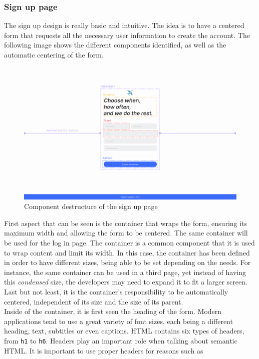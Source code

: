 \documentclass[./memory.tex]{subfiles}
\begin{document}
\subsubsection{Sign up page}
The sign up design is really basic and intuitive. The idea is to have a centered
form that requests all the necessary user information to create the account. The
following image shows the different components identified, as well as the
automatic centering of the form.
\begin{figure}[H]
	\centering
	\includegraphics[width=\textwidth]{./assets/designs/sign-up-components.png}
	\caption{Component destructure of the sign up page}
\end{figure}
First aspect that can be seen is the container that wraps the form, ensuring
its maximum width and allowing the form to be centered. The same container will
be used for the log in page. The container is a common component that it is used
to wrap content and limit its width. In this case, the container has been
defined in order to have different sizes, being able to be set depending on the
needs. For instance, the same container can be used in a third page, yet instead
of having this \emph{condensed} size, the developers may need to expand it to
fit a larger screen. Last but not least, it is the container's responsibility to
be automatically centered, independent of its size and the size of its parent.
\\[8pt]
Inside of the container, it is first seen the heading of the form. Modern
applications tend to use a great variety of font sizes, each being a different
heading, text, subtitles or even captions. HTML contains six types of headers,
from \texttt{h1} to \texttt{h6}. Headers play an important role when talking about
semantic HTML. It is important to use proper headers for reasons such as
\end{document}
